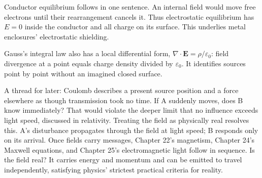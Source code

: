 \begin{mathbridge}

Conductor equilibrium follows in one sentence. An internal field would move free electrons until their rearrangement cancels it. Thus electrostatic equilibrium has \(E=0\) inside the conductor and all charge on its surface. This underlies metal enclosures' electrostatic shielding.
\end{mathbridge}

\begin{challenge}
Gauss's integral law also has a local differential form, \(\nabla\cdot\mathbf E=\rho/\varepsilon_0\): field divergence at a point equals charge density divided by \(\varepsilon_0\). It identifies sources point by point without an imagined closed surface.

A thread for later: Coulomb describes a present source position and a force elsewhere as though transmission took no time. If A suddenly moves, does B know immediately? That would violate the deeper limit that no influence exceeds light speed, discussed in relativity. Treating the field as physically real resolves this. A's disturbance propagates through the field at light speed; B responds only on its arrival. Once fields carry messages, Chapter 22's magnetism, Chapter 24's Maxwell equations, and Chapter 25's electromagnetic light follow in sequence. Is the field real? It carries energy and momentum and can be emitted to travel independently, satisfying physics' strictest practical criteria for reality.
\end{challenge}


